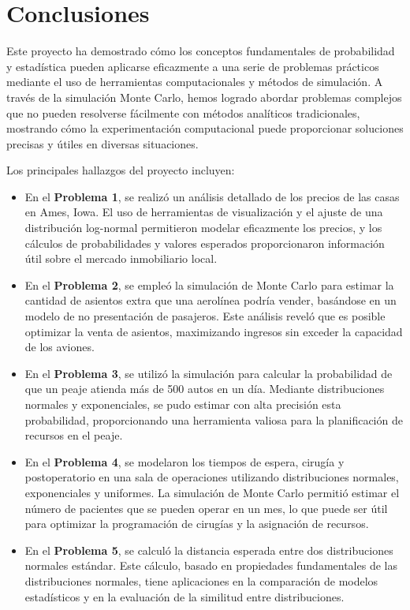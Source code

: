 \documentclass[12pt]{article}
\begin{document}
\section{Conclusiones}

Este proyecto ha demostrado cómo los conceptos fundamentales de probabilidad y estadística pueden aplicarse eficazmente a una serie de problemas prácticos mediante el uso de herramientas computacionales y métodos de simulación. A través de la simulación Monte Carlo, hemos logrado abordar problemas complejos que no pueden resolverse fácilmente con métodos analíticos tradicionales, mostrando cómo la experimentación computacional puede proporcionar soluciones precisas y útiles en diversas situaciones.

Los principales hallazgos del proyecto incluyen:

\begin{itemize}
    \item En el \textbf{Problema 1}, se realizó un análisis detallado de los precios de las casas en Ames, Iowa. El uso de herramientas de visualización y el ajuste de una distribución log-normal permitieron modelar eficazmente los precios, y los cálculos de probabilidades y valores esperados proporcionaron información útil sobre el mercado inmobiliario local.
    
    \item En el \textbf{Problema 2}, se empleó la simulación de Monte Carlo para estimar la cantidad de asientos extra que una aerolínea podría vender, basándose en un modelo de no presentación de pasajeros. Este análisis reveló que es posible optimizar la venta de asientos, maximizando ingresos sin exceder la capacidad de los aviones.
    
    \item En el \textbf{Problema 3}, se utilizó la simulación para calcular la probabilidad de que un peaje atienda más de 500 autos en un día. Mediante distribuciones normales y exponenciales, se pudo estimar con alta precisión esta probabilidad, proporcionando una herramienta valiosa para la planificación de recursos en el peaje.
    
    \item En el \textbf{Problema 4}, se modelaron los tiempos de espera, cirugía y postoperatorio en una sala de operaciones utilizando distribuciones normales, exponenciales y uniformes. La simulación de Monte Carlo permitió estimar el número de pacientes que se pueden operar en un mes, lo que puede ser útil para optimizar la programación de cirugías y la asignación de recursos.
    
    \item En el \textbf{Problema 5}, se calculó la distancia esperada entre dos distribuciones normales estándar. Este cálculo, basado en propiedades fundamentales de las distribuciones normales, tiene aplicaciones en la comparación de modelos estadísticos y en la evaluación de la similitud entre distribuciones.
\end{itemize}
\end{document}
